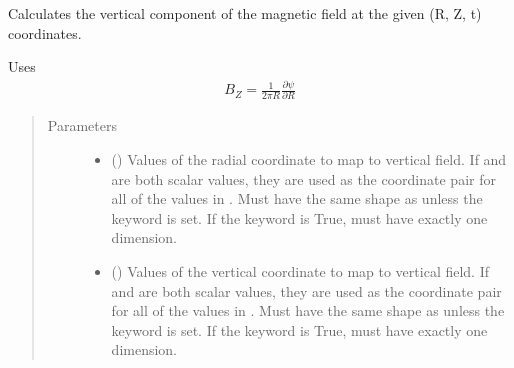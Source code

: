 \documentclass[letterpaper,10pt,english]{sphinxmanual}
\begin{document}
\begin{fulllineitems}
\begin{fulllineitems}
\begin{sphinxVerbatim}[commandchars=\\\{\}]
     
\end{sphinxVerbatim}

\end{fulllineitems}


\begin{fulllineitems}
\label{\detokenize{eqtools:eqtools.AUGData.AUGDDData.rz2BZ}}
Calculates the vertical component of the magnetic field at the given (R, Z, t) coordinates.

Uses
\begin{equation*}
\begin{split}B_Z = \frac{1}{2 \pi R}\frac{\partial \psi}{\partial R}\end{split}
\end{equation*}\begin{quote}\begin{description}
\item[{Parameters}] \leavevmode\begin{itemize}
\item {} 
 () \textendash{} Values of the radial coordinate to
map to vertical field. If  and  are both scalar values,
they are used as the coordinate pair for all of the values in
. Must have the same shape as  unless the 
keyword is set. If the  keyword is True,  must
have exactly one dimension.

\item {} 
 () \textendash{} Values of the vertical coordinate to
map to vertical field. If  and  are both scalar values,
they are used as the coordinate pair for all of the values in
. Must have the same shape as  unless the 
keyword is set. If the  keyword is True,  must
have exactly one dimension.


\end{itemize}
\end{description}
\end{quote}
\end{fulllineitems}
\end{fulllineitems}
\end{document}
